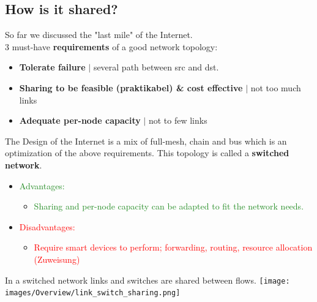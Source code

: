 \documentclass[a4paper, fontsize=8pt, landscape, DIV=1]{scrartcl}
\begin{document}
\begin{multicols*}{4}
			\subsection{How is it shared?}
				So far we discussed the "last mile" of the Internet.\\
				3 must-have \textbf{requirements} of a good network topology: 
				\begin{itemize}
					\item \textbf{Tolerate failure} $\vert$ several path between src and dst.
					\item \textbf{Sharing to be feasible (praktikabel) \& cost effective } $\vert$ not too much links 
					\item \textbf{Adequate per-node capacity} $\vert$ not to few links 
				\end{itemize}
				The Design of the Internet is a mix of full-mesh, chain and bus which is an optimization of the above requirements. This topology is called a \textbf{switched network}.
				\vspace{-0.5cm}
				\begin{itemize}[noitemsep,topsep=0pt]
					\item \textcolor{ForestGreen}{Advantages:}
					\begin{itemize}
						\item \textcolor{ForestGreen}{Sharing and per-node capacity can be adapted to fit the network needs.}
					\end{itemize} 
					\item \textcolor{Red}{Disadvantages:}
					\begin{itemize}
						\item \textcolor{Red}{Require smart devices to perform; forwarding, routing, resource allocation (Zuweisung) }
					\end{itemize} 
				\end{itemize} 
				In a switched network links and switches are shared between flows.
				\texttt{[image: images/Overview/link\_switch\_sharing.png]}
				\columnbreak
				

\end{multicols*}
\end{document}
